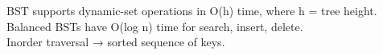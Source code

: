 \documentclass[preview]{standalone}
\begin{document}
BST supports dynamic-set operations in O(h) time, where h = tree height.\\Balanced BSTs have O(log n) time for search, insert, delete.\\Inorder traversal → sorted sequence of keys.\\
\end{document}
